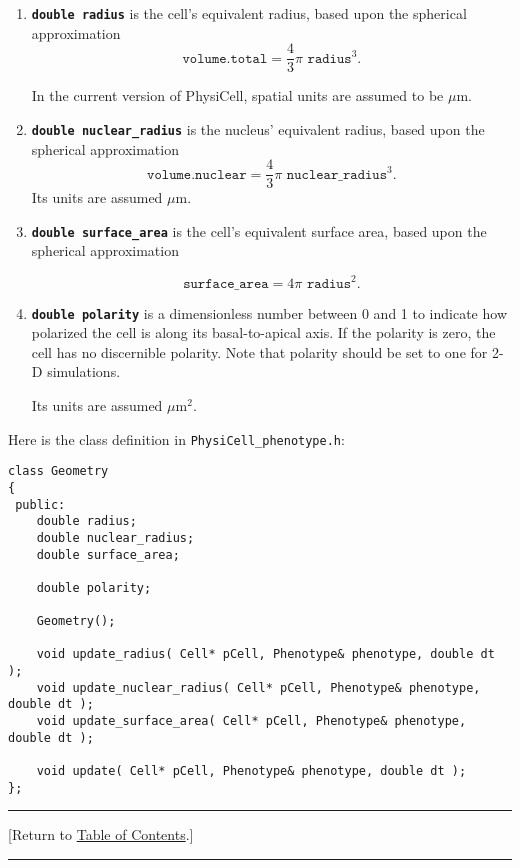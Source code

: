 \documentclass[12pt]{article}
\newcommand{\beq}{\begin{equation}}
\newcommand{\eeq}{\end{equation}}
\newcommand{\micron}{\mu\textrm{m}}
\renewcommand{\v}{\verb}
\newcommand{\smallcode}[1]{\textbf{\texttt{#1}}}
\newcommand{\TOClink}{\begin{center}\hrule\vskip-10pt\phantom{.}\hfill[Return to \hyperlink{TOC}{Table of Contents}.]\hfill\phantom{.}\vskip3pt\hrule\end{center}}
\begin{document}
\begin{enumerate}
\item 
\smallcode{double radius} is the cell's equivalent radius, based upon the spherical approximation 
\beq
\texttt{volume.total} = \frac{4}{3} \pi \texttt{ radius}^3. 
\eeq

In the current version of PhysiCell, spatial units are assumed to be $\micron$. 

\item 
\smallcode{double nuclear\_radius} is the nucleus' equivalent radius, based upon the spherical approximation 
\beq
\texttt{volume.nuclear} = \frac{4}{3} \pi \texttt{ nuclear\_radius}^3.
\eeq
Its units are assumed $\micron$. 

\item 
\smallcode{double surface\_area} is the cell's equivalent surface area, based upon the spherical approximation 

\beq
\texttt{surface\_area} = 4 \pi \texttt{ radius}^2.
\eeq

\item 
\smallcode{double polarity} is a dimensionless number between 0 and 1 to indicate how polarized the cell is along its basal-to-apical axis. If the polarity is zero, the cell has no discernible polarity. Note that polarity should be set to one for 2-D simulations. 

Its units are assumed $\micron^2$. 
\end{enumerate}

Here is the class definition in \v|PhysiCell_phenotype.h|:
\begin{verbatim}
class Geometry
{
 public:
    double radius; 
    double nuclear_radius; 
    double surface_area; 
    
    double polarity; 
    
    Geometry();      
    
    void update_radius( Cell* pCell, Phenotype& phenotype, double dt );      
    void update_nuclear_radius( Cell* pCell, Phenotype& phenotype, double dt );      
    void update_surface_area( Cell* pCell, Phenotype& phenotype, double dt );      
    
    void update( Cell* pCell, Phenotype& phenotype, double dt );      
};
\end{verbatim}

\TOClink
\end{document}
